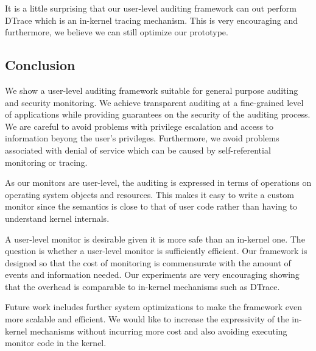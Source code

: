 It is a little surprising that our user-level auditing framework
can out perform DTrace which is an in-kernel tracing mechanism.
This is very encouraging and furthermore, 
we believe we can still optimize our prototype.

\subsection{Conclusion}

We show a user-level auditing framework suitable for general purpose
auditing and security monitoring. 
We achieve transparent auditing
at a fine-grained level of applications while providing guarantees
on the security of the auditing process. We are careful to avoid problems
with privilege escalation and access to information beyong the user's
privileges. Furthermore, we avoid problems associated with denial of
service which can be caused by self-referential monitoring or tracing.

As our monitors are user-level, the auditing is expressed in terms
of operations on operating system objects and resources. This makes it
easy to write a custom monitor since the semantics is close to that
of user code rather than having to understand kernel internals.

A user-level monitor is desirable given it is more safe than an in-kernel one.
The question is whether a user-level monitor is sufficiently efficient. 
Our framework is designed so that the cost of monitoring
is commensurate with the amount of events and information needed.
Our experiments are very encouraging 
showing that the overhead is comparable to in-kernel 
mechanisms such as DTrace.

Future work includes further system optimizations to make the framework
even more scalable and efficient. We would like to increase the
expressivity of the in-kernel mechanisms without incurring more cost
and also avoiding executing monitor code in the kernel.

